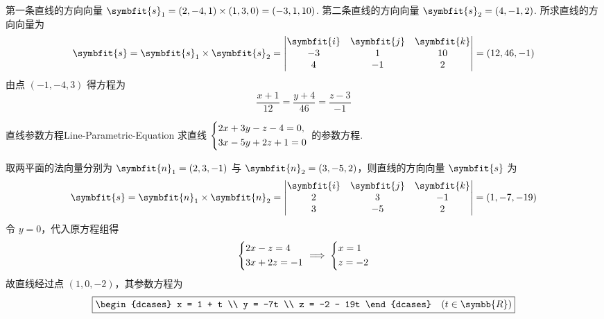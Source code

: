 \begin{solution}
    第一条直线的方向向量 $\symbfit{s}_1 = (2, -4, 1) \times (1, 3, 0) = (-3, 1, 10)$. 第二条直线的方向向量 $\symbfit{s}_2 = (4, -1, 2)$.
    所求直线的方向向量为
    \begin{equation}
        \symbfit{s} = \symbfit{s}_1 \times \symbfit{s}_2 =
        \begin{vmatrix}
            \symbfit{i} & \symbfit{j} & \symbfit{k} \\
            -3          & 1           & 10          \\
            4           & -1          & 2
        \end{vmatrix} = (12, 46, -1)
    \end{equation}
    由点 $(-1, -4, 3)$ 得方程为
    \begin{equation}
        \boxed{\frac{x+1}{12} = \frac{y+4}{46} = \frac{z-3}{-1}}
    \end{equation}
\end{solution}


\begin{problem}{直线参数方程}{Line-Parametric-Equation}
    求直线 $\begin{dcases} 2x + 3y - z - 4 = 0, \\ 3x - 5y + 2z + 1 = 0 \end{dcases}$ 的参数方程.
\end{problem}

\begin{solution}
    取两平面的法向量分别为 $\symbfit{n}_1 = (2, 3, -1)$ 与 $\symbfit{n}_2 = (3, -5, 2)$，则直线的方向向量 $\symbfit{s}$ 为
    \begin{equation}
        \symbfit{s} = \symbfit{n}_1 \times \symbfit{n}_2 = \begin{vmatrix} \symbfit{i} & \symbfit{j} & \symbfit{k} \\ 2 & 3 & -1 \\ 3 & -5 & 2 \end{vmatrix} = (1, -7, -19)
    \end{equation}
    令 $y = 0$，代入原方程组得
    \begin{equation}
        \begin{dcases} 2x - z = 4 \\ 3x + 2z = -1 \end{dcases} \implies \begin{dcases} x = 1 \\ z = -2 \end{dcases}
    \end{equation}
    故直线经过点 $(1, 0, -2)$，其参数方程为
    \begin{equation}
        \boxed{\begin{dcases} x = 1 + t \\ y = -7t \\ z = -2 - 19t \end{dcases} \quad (t \in \symbb{R})}
    \end{equation}
\end{solution}

